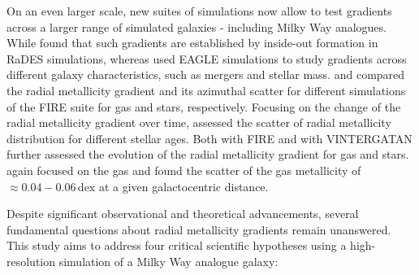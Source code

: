 \documentclass[fleqn,usenatbib]{mnras}
\begin{document}
On an even larger scale, new suites of simulations now allow to test gradients across a larger range of simulated galaxies - including Milky Way analogues. While \citet{Pilkington2012} found that such gradients are established by inside-out formation in RaDES simulations, whereas \citet{Tissera2019} used EAGLE simulations to study gradients across different galaxy characteristics, such as mergers and stellar mass. \citet{Bellardini2021} and \citet{Bellardini2022, Graf2024} compared the radial metallicity gradient and its azimuthal scatter for different simulations of the FIRE suite for gas and stars, respectively. Focusing on the change of the radial metallicity gradient over time, \citet{Grand2015} assessed the scatter of radial metallicity distribution for different stellar ages. Both \citet[][see their Fig. 6]{Ma2017} with FIRE and \citet[see their Fig. 9][]{Agertz2021} with VINTERGATAN further assessed the evolution of the radial metallicity gradient for gas and stars. \citet{Khoperskov2023e} again focused on the gas and found the scatter of the gas metallicity of $\approx 0.04-0.06\,\mathrm{dex}$ at a given galactocentric distance.

Despite significant observational and theoretical advancements, several fundamental questions about radial metallicity gradients remain unanswered. This study aims to address four critical scientific hypotheses using a high-resolution simulation of a Milky Way analogue galaxy:
\end{document}
